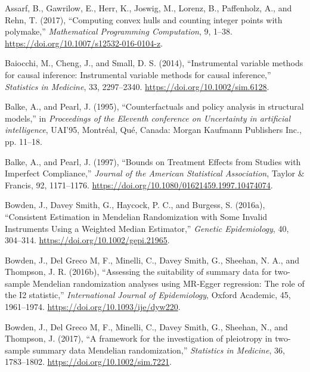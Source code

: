 \documentclass[
]{article}
\theoremstyle{plain}
\begin{document}
\leavevmode\hypertarget{ref-assarf_computing_2017}{}%
Assarf, B., Gawrilow, E., Herr, K., Joswig, M., Lorenz, B., Paffenholz, A., and Rehn, T. (2017), ``Computing convex hulls and counting integer points with polymake,'' \emph{Mathematical Programming Computation}, 9, 1--38. \url{https://doi.org/10.1007/s12532-016-0104-z}.

\leavevmode\hypertarget{ref-baiocchi_instrumental_2014}{}%
Baiocchi, M., Cheng, J., and Small, D. S. (2014), ``Instrumental variable methods for causal inference: Instrumental variable methods for causal inference,'' \emph{Statistics in Medicine}, 33, 2297--2340. \url{https://doi.org/10.1002/sim.6128}.

\leavevmode\hypertarget{ref-balke_counterfactuals_1995}{}%
Balke, A., and Pearl, J. (1995), ``Counterfactuals and policy analysis in structural models,'' in \emph{Proceedings of the Eleventh conference on Uncertainty in artificial intelligence}, UAI'95, Montréal, Qué, Canada: Morgan Kaufmann Publishers Inc., pp. 11--18.

\leavevmode\hypertarget{ref-balke_bounds_1997}{}%
Balke, A., and Pearl, J. (1997), ``Bounds on Treatment Effects from Studies with Imperfect Compliance,'' \emph{Journal of the American Statistical Association}, Taylor \& Francis, 92, 1171--1176. \url{https://doi.org/10.1080/01621459.1997.10474074}.

\leavevmode\hypertarget{ref-bowden_consistent_2016}{}%
Bowden, J., Davey Smith, G., Haycock, P. C., and Burgess, S. (2016a), ``Consistent Estimation in Mendelian Randomization with Some Invalid Instruments Using a Weighted Median Estimator,'' \emph{Genetic Epidemiology}, 40, 304--314. \url{https://doi.org/10.1002/gepi.21965}.

\leavevmode\hypertarget{ref-bowden_assessing_2016}{}%
Bowden, J., Del Greco M, F., Minelli, C., Davey Smith, G., Sheehan, N. A., and Thompson, J. R. (2016b), ``Assessing the suitability of summary data for two-sample Mendelian randomization analyses using MR-Egger regression: The role of the I2 statistic,'' \emph{International Journal of Epidemiology}, Oxford Academic, 45, 1961--1974. \url{https://doi.org/10.1093/ije/dyw220}.

\leavevmode\hypertarget{ref-bowden_framework_2017}{}%
Bowden, J., Del Greco M, F., Minelli, C., Davey Smith, G., Sheehan, N., and Thompson, J. (2017), ``A framework for the investigation of pleiotropy in two-sample summary data Mendelian randomization,'' \emph{Statistics in Medicine}, 36, 1783--1802. \url{https://doi.org/10.1002/sim.7221}.
\end{document}
